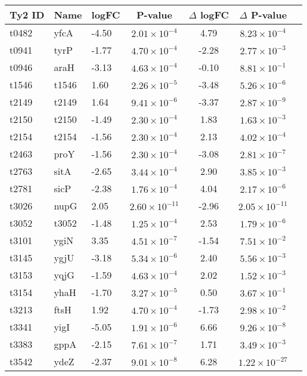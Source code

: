 \begin{table}
\begin{tabular}{ l
    				l
				l
    				c
				c
				c
				c
				}
    \\
     \toprule
    \textbf{Ty2 ID} & \textbf{Name} & \textbf{logFC} & \textbf{P-value} & \textbf{$\Delta$ logFC} & \textbf{$\Delta$ P-value} \\
    \midrule
    t0482 & yfcA & -4.50 & $2.01\times10^{-4}$ & 4.79 & $8.23\times10^{-4}$\\
    t0941 & tyrP & -1.77 & $4.70\times10^{-4}$ & -2.28 & $2.77\times10^{-3}$\\
    t0946 & araH & -3.13 & $4.63\times10^{-4}$ & -0.10 & $8.81\times10^{-1}$\\
    t1546 & t1546 & 1.60 & $2.26\times10^{-5}$ & -3.48 & $5.26\times10^{-6}$\\
    t2149 & t2149 & 1.64 & $9.41\times10^{-6}$ & -3.37 & $2.87\times10^{-9}$\\
    t2150 & t2150 & -1.49 & $2.30\times10^{-4}$ & 1.83 & $1.63\times10^{-3}$\\
    t2154 & t2154 & -1.56 & $2.30\times10^{-4}$ & 2.13 & $4.02\times10^{-4}$\\
    t2463 & proY & -1.56 & $2.30\times10^{-4}$ & -3.08 & $2.81\times10^{-7}$\\
    t2763 & sitA & -2.65 & $3.44\times10^{-4}$ & 2.90 & $3.85\times10^{-3}$\\
    t2781 & sicP & -2.38 & $1.76\times10^{-4}$ & 4.04 & $2.17\times10^{-6}$\\
    t3026 & nupG & 2.05 & $2.60\times10^{-11}$ & -2.96 & $2.05\times10^{-11}$\\
    t3052 & t3052 & -1.48 & $1.25\times10^{-4}$ & 2.53 & $1.79\times10^{-6}$\\
    t3101 & ygiN & 3.35 & $4.51\times10^{-7}$ & -1.54 & $7.51\times10^{-2}$\\
    t3145 & ygjU & -3.18 & $5.34\times10^{-6}$ & 2.40 & $5.56\times10^{-3}$\\
    t3153 & yqjG & -1.59 & $4.63\times10^{-4}$ & 2.02 & $1.52\times10^{-3}$\\
    t3154 & yhaH & -1.70 & $3.27\times10^{-5}$ & 0.50 & $3.67\times10^{-1}$\\
    t3213 & ftsH & 1.92 & $4.70\times10^{-4}$ & -1.73 & $2.98\times10^{-2}$\\
    t3341 & yigI & -5.05 & $1.91\times10^{-6}$ & 6.66 & $9.26\times10^{-8}$\\
    t3383 & gppA & -2.15 & $7.61\times10^{-7}$ & 1.71 & $3.49\times10^{-3}$\\
    t3542 & ydeZ & -2.37 & $9.01\times10^{-8}$ & 6.28 & $1.22\times10^{-27}$\\

\end{tabular}
\end{table}
